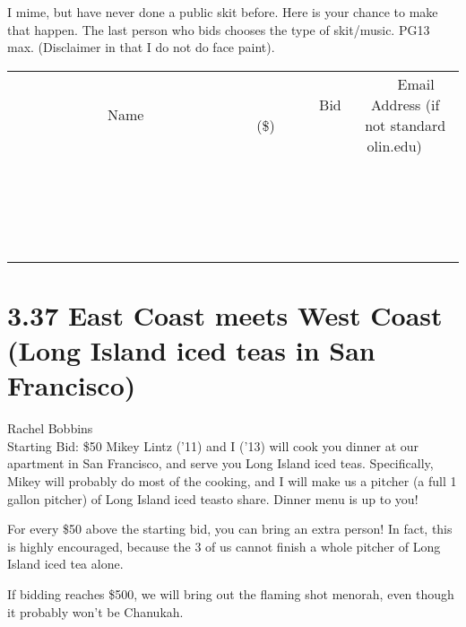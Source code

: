 \documentclass[11pt]{article}
\begin{document}
I mime, but have never done a public skit before. Here is your chance to make that happen. The last person who bids chooses the type of skit/music. PG13 max. (Disclaimer in that I do not do face paint).
\\[3ex]
\begin{tabular}{c c c}
~~~~~~~~~~~~~Name~~~~~~~~~~~~~ & ~~~~~~~~~Bid (\$)~~~~~~~~~  & ~~~Email Address (if not standard olin.edu)~~~\\
 & & \\
\hline
 & & \\
\hline
 & & \\
\hline
 & & \\
\hline
 & & \\
\hline
 & & \\
\hline
 & & \\
\hline
 & & \\
\hline
 & & \\
\hline
 & & \\
\hline
 & & \\
\hline
 & & \\
\hline
 & & \\
\hline
 & & \\
\hline
 & & \\
\hline
 & & \\
\hline
 & & \\
\hline
 & & \\
\hline
 & & \\
\hline
\end{tabular}
\newpage
\section*{3.37 East Coast meets West Coast (Long Island iced teas in San Francisco)}
Rachel Bobbins
\\
Starting Bid: \$50
\newline
Mikey Lintz ('11) and I ('13) will cook you dinner at our apartment in San Francisco, and serve you Long Island iced teas. Specifically, Mikey will probably do most of the cooking, and I will make us a pitcher  (a full 1 gallon pitcher) of Long Island iced teasto share. Dinner menu is up to you!

For every \$50 above the starting bid, you can bring an extra person! In fact, this is highly encouraged, because the 3 of us cannot finish a whole pitcher of Long Island iced tea alone.

If bidding reaches \$500, we will bring out the flaming shot menorah, even though it probably won't be Chanukah.
\end{document}

